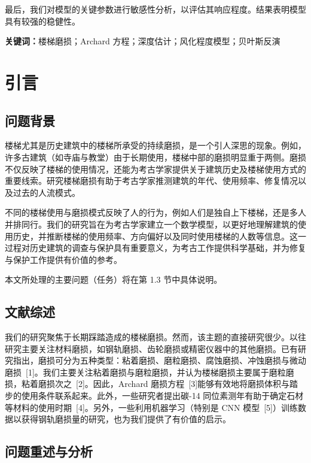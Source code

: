 \documentclass[11pt,a4paper]{ctexart}
\begin{document}
最后，我们对模型的关键参数进行敏感性分析，以评估其响应程度。结果表明模型具有较强的稳健性。

\vspace{4pt}
\noindent\textbf{关键词：}楼梯磨损；Archard 方程；深度估计；风化程度模型；贝叶斯反演

\newpage

\section{引言}

\subsection{问题背景}

楼梯尤其是历史建筑中的楼梯所承受的持续磨损，是一个引人深思的现象。例如，许多古建筑（如寺庙与教堂）由于长期使用，楼梯中部的磨损明显重于两侧。磨损不仅反映了楼梯的使用情况，还能为考古学家提供关于建筑历史及楼梯使用方式的重要线索。研究楼梯磨损有助于考古学家推测建筑的年代、使用频率、修复情况以及过去的人流模式。

不同的楼梯使用与磨损模式反映了人的行为，例如人们是独自上下楼梯，还是多人并排同行。我们的研究旨在为考古学家建立一个数学模型，以更好地理解建筑的使用历史，并推断楼梯的使用频率、方向偏好以及同时使用楼梯的人数等信息。这一过程对历史建筑的调查与保护具有重要意义，为考古工作提供科学基础，并为修复与保护工作提供有价值的参考。

本文所处理的主要问题（任务）将在第 1.3 节中具体说明。

\subsection{文献综述}

我们的研究聚焦于长期踩踏造成的楼梯磨损。然而，该主题的直接研究很少。以往研究主要关注材料磨损，如钢轨磨损、齿轮磨损或精密仪器中的其他磨损。已有研究指出，磨损可分为五种类型：粘着磨损、磨粒磨损、腐蚀磨损、冲蚀磨损与微动磨损\ [1]。我们主要关注粘着磨损与磨粒磨损，并认为楼梯磨损主要属于磨粒磨损，粘着磨损次之\ [2]。因此，Archard 磨损方程\ [3]能够有效地将磨损体积与踏步的使用条件联系起来。此外，一些研究者提出碳-14 同位素测年有助于确定石材等材料的使用时期\ [4]。另外，一些利用机器学习（特别是 CNN 模型\ [5]）训练数据以获得钢轨磨损量的研究，也为我们提供了有价值的启示。

\subsection{问题重述与分析}
\end{document}
